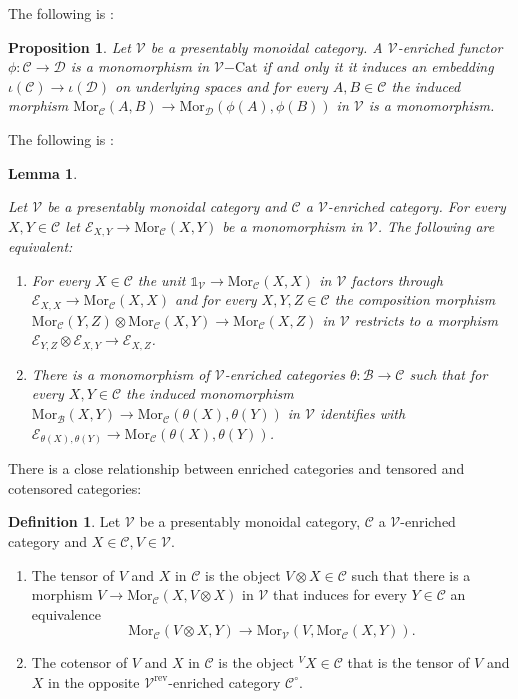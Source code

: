 \documentclass[10pt,oneside]{article}
\numberwithin{equation}{section} %
\numberwithin{figure}{section} %
\theoremstyle{plain}
\newtheorem{lemma}[theorem]{Lemma}
\newtheorem{proposition}[theorem]{Proposition}
\theoremstyle{definition}
\newtheorem{definition}[theorem]{Definition}
\newcommand{\mB}{{\mathcal B}}
\newcommand{\mC}{{\mathcal C}}
\newcommand{\mD}{{\mathcal D}}
\newcommand{\mE}{{\mathcal E}}
\newcommand{\mV}{{\mathcal V}}
\newcommand{\rev}{{\mathrm{rev}}}
\newcommand{\ot}{\otimes}
\newcommand{\Cat}{\mathrm{Cat}}
\newcommand{\tu}{{\mathbb 1}}
\newcommand{\Mor}{{\mathrm{Mor}}}
\begin{document}
The following is \cite[Proposition 2.1.5.]{GepnerHeine2026}:

\begin{proposition}\label{monochar}
Let $\mV$ be a presentably monoidal category.
A $\mV$-enriched functor $\phi: \mC \to \mD$ is a monomorphism in $\mV\mathrm{-}\Cat$ if and only it it induces an embedding $\iota(\mC) \to \iota(\mD)$ on underlying spaces and for every $A,B \in \mC$ the induced morphism 
$\Mor_\mC(A, B) \to \Mor_\mD(\phi(A), \phi(B))$ in $\mV$ is a monomorphism.
    
\end{proposition}

The following is \cite[Example 3.1.13.]{heine2024higher}:

\begin{lemma}\label{enrsub}

Let $\mV$ be a presentably monoidal category and $\mC$ a $\mV$-enriched category. For every $X,Y \in \mC$ let
$\mE_{X,Y} \to \Mor_\mC(X,Y)$ be a monomorphism in $\mV$.
The following are equivalent:
\begin{enumerate}[\normalfont(1)]\setlength{\itemsep}{-2pt}
\item For every $X \in \mC$ the unit $\tu_\mV \to \Mor_\mC(X,X)$ in $\mV$ factors through $\mE_{X,X} \to \Mor_\mC(X,X)$
and for every $X,Y,Z \in \mC$ the composition morphism $\Mor_\mC(Y,Z) \ot \Mor_\mC(X,Y) \to \Mor_\mC(X,Z) $ in $\mV$ 
restricts to a morphism $\mE_{Y,Z} \ot \mE_{X,Y} \to \mE_{X,Z} $.



\item There is a monomorphism of $\mV$-enriched categories $\theta: \mB \to \mC$
such that for every $X,Y \in \mC$ the induced monomorphism 
$\Mor_\mB(X,Y) \to \Mor_\mC(\theta(X),\theta(Y))$ in $\mV$ identifies with 
$\mE_{\theta(X),\theta(Y)} \to \Mor_\mC(\theta(X),\theta(Y))$.

\end{enumerate}

\end{lemma}

There is a close relationship between enriched categories
and tensored and cotensored categories:

\begin{definition}Let $\mV$ be a presentably monoidal category, $\mC$ a $\mV$-enriched category and $X \in \mC, V \in \mV.$	 
\begin{enumerate}[\normalfont(1)]\setlength{\itemsep}{-2pt}
\item The tensor of $V$ and $X$ in $\mC$ is the object $V \ot X \in \mC $ such that there is a morphism
$V \to \Mor_\mC(X, V \ot X) $ in $\mV$ that induces for every $Y \in \mC$ an equivalence
$$ \Mor_\mC(V \ot X,Y) \to \Mor_\mV(V, \Mor_\mC(X,Y)). $$ 
\item The cotensor of $V$ and $X$ in $\mC$ is the object ${^V X} \in \mC $ that is the tensor of $V $ and $X$ in the opposite $\mV^\rev$-enriched category $\mC^\circ.$
\end{enumerate}	
\end{definition}
\end{document}
